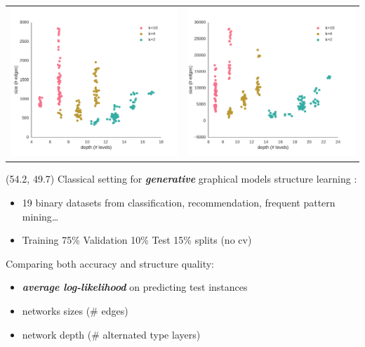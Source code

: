 \documentclass[final]{beamer}
\begin{document}
\begin{frame}{}
\begin{textblock}{25.7}
    \begin{table}[ht]
      \setlength{\tabcolsep}{30pt}  
      \centering
      \begin{tabular}{c c}
        \includegraphics[width=0.4\linewidth]{figures/nltcs-depth.pdf}&\includegraphics[width=0.4\linewidth]{figures/plants-depth.pdf}
      \end{tabular}
    \end{table}
  \end{textblock}
  
  \begin{textblock}{25.7}(54.2, 49.7)
    \footnotesize
    Classical setting for \emph{\textbf{generative}} graphical models
    structure learning \parencite{Gens2013}:
    \setlength{\leftmargini}{30pt}
    \begin{itemize}
      \itemsep 7pt
    \item 19 binary datasets from classification, recommendation,
      frequent pattern mining\dots \parencite{Lowd2010} \parencite{Haaren2012}
    \item Training 75\% Validation 10\% Test 15\%  splits (no cv)
    \end{itemize}\bigskip

    Comparing both accuracy and structure quality:
    \begin{itemize}
    \item \emph{\textbf{average log-likelihood}} on predicting test
      instances
    \item networks sizes (\# edges)
    \item network depth (\# alternated type layers)


\end{itemize}
\end{textblock}
\end{frame}
\end{document}

